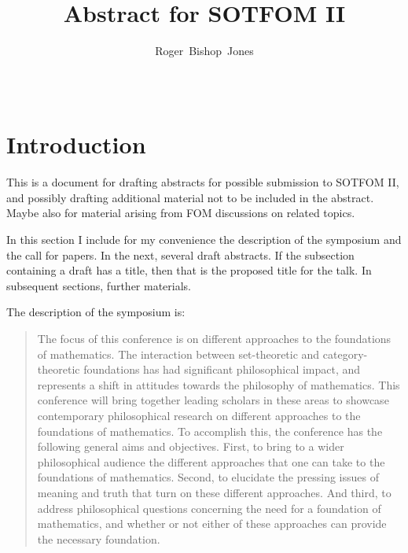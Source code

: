 \documentclass[10pt,titlepage]{article}
\title{Abstract for SOTFOM II}
\author{Roger~Bishop~Jones}
\date{\ }
\begin{document}
                               
\begin{titlepage}
\maketitle






\end{titlepage}

\setcounter{tocdepth}{2}
{\parskip-0pt\tableofcontents}



\section{Introduction}

This is a document for drafting abstracts for possible submission to SOTFOM II, and possibly drafting additional material not to be included in the abstract.
Maybe also for material arising from FOM discussions on related topics.

In this section I include for my convenience the description of the symposium and the call for papers.
In the next, several draft abstracts.
If the subsection containing a draft has a title, then that is the proposed title for the talk.
In subsequent sections, further materials.

The description of the symposium is:

\begin{quotation}
The focus of this conference is on different approaches to the foundations of mathematics. The interaction between set-theoretic and category-theoretic foundations has had significant philosophical impact, and represents a shift in attitudes towards the philosophy of mathematics. This conference will bring together leading scholars in these areas to showcase contemporary philosophical research on different approaches to the foundations of mathematics. To accomplish this, the conference has the following general aims and objectives. First, to bring to a wider philosophical audience the different approaches that one can take to the foundations of mathematics. Second, to elucidate the pressing issues of meaning and truth that turn on these different approaches. And third, to address philosophical questions concerning the need for a foundation of mathematics, and whether or not either of these approaches can provide the necessary foundation.
\end{quotation}
\end{document}
